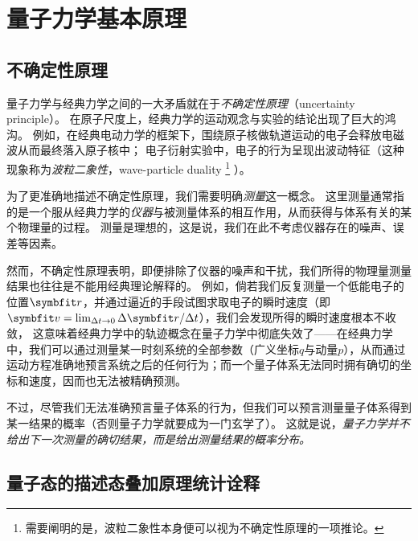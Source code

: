 
\section{量子力学基本原理}

\subsection{不确定性原理}

量子力学与经典力学之间的一大矛盾就在于\emph{不确定性原理}（uncertainty principle）。
在原子尺度上，经典力学的运动观念与实验的结论出现了巨大的鸿沟。
例如，在经典电动力学的框架下，围绕原子核做轨道运动的电子会释放电磁波从而最终落入原子核中；
电子衍射实验中，电子的行为呈现出波动特征（这种现象称为\emph{波粒二象性}，wave-particle duality
\footnote{需要阐明的是，波粒二象性本身便可以视为不确定性原理的一项推论。}
）。

为了更准确地描述不确定性原理，我们需要明确\emph{测量}这一概念。
这里测量通常指的是一个服从经典力学的\emph{仪器}与被测量体系的相互作用，从而获得与体系有关的某个物理量的过程。
测量是理想的，这是说，我们在此不考虑仪器存在的噪声、误差等因素。

然而，不确定性原理表明，即便排除了仪器的噪声和干扰，我们所得的物理量测量结果也往往是不能用经典理论解释的。
例如，倘若我们反复测量一个低能电子的位置$\rr$，并通过逼近的手段试图求取电子的瞬时速度（即$\bm{v}=\lim_{\Delta t\rightarrow 0}\Delta\rr/\Delta t$），我们会发现所得的瞬时速度根本不收敛，
这意味着经典力学中的轨迹概念在量子力学中彻底失效了——在经典力学中，我们可以通过测量某一时刻系统的全部参数（广义坐标$q$与动量$p$），从而通过运动方程准确地预言系统之后的任何行为；而一个量子体系无法同时拥有确切的坐标和速度，因而也无法被精确预测。

不过，尽管我们无法准确预言量子体系的行为，但我们可以预言测量量子体系得到某一结果的概率（否则量子力学就要成为一门玄学了）。
这就是说，\emph{量子力学并不给出下一次测量的确切结果，而是给出测量结果的概率分布。}


\subsection{\texorpdfstring{量子态的描述\quad 态叠加原理\quad 统计诠释}{量子态的表示  态叠加原理  统计诠释}}

